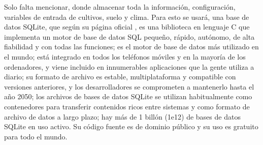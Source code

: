 Solo falta mencionar, donde almacenar toda la información, configuración, variables de entrada de cultivos, suelo y clima. Para esto se usará, una base de datos SQLite, que según su página oficial \parencite{sqlite_nodate}, es una biblioteca en lenguaje C que implementa un motor de base de datos SQL pequeño, rápido, autónomo, de alta fiabilidad y con todas las funciones; es el motor de base de datos más utilizado en el mundo; está integrado en todos los teléfonos móviles y en la mayoría de los ordenadores, y viene incluido en innumerables aplicaciones que la gente utiliza a diario; su formato de archivo es estable, multiplataforma y compatible con versiones anteriores, y los desarrolladores se comprometen a mantenerlo hasta el año 2050; los archivos de bases de datos SQLite se utilizan habitualmente como contenedores para transferir contenidos ricos entre sistemas y como formato de archivo de datos a largo plazo; hay más de 1 billón (1e12) de bases de datos SQLite en uso activo. Su código fuente es de dominio público y su uso es gratuito para todo el mundo.\\












